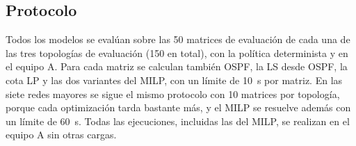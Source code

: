 \subsection{Protocolo}

Todos los modelos se evalúan sobre las 50 matrices de evaluación de cada una de las tres topologías de evaluación (150 en total), con la política determinista y en el equipo A. Para cada matriz se calculan también OSPF, la LS desde OSPF, la cota LP y las dos variantes del MILP, con un límite de 10~s por matriz. En las siete redes mayores se sigue el mismo protocolo con 10 matrices por topología, porque cada optimización tarda bastante más, y el MILP se resuelve además con un límite de 60~s. Todas las ejecuciones, incluidas las del MILP, se realizan en el equipo A sin otras cargas.
